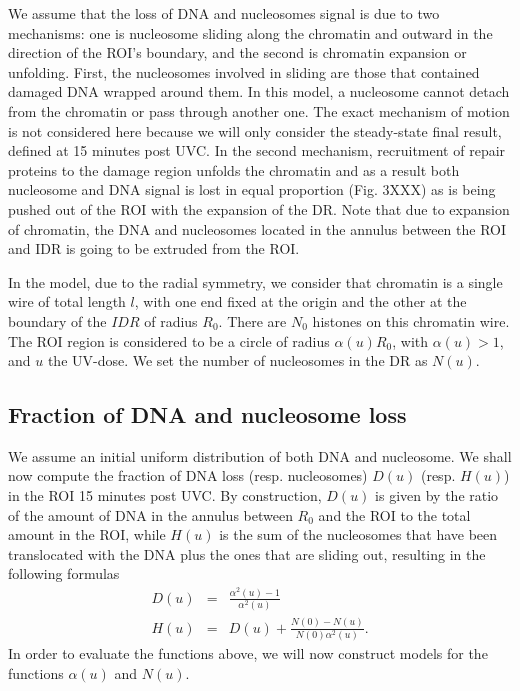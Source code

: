 \documentclass[12pt]{article}
\begin{document}
We assume that the loss of DNA and nucleosomes signal is due to two mechanisms: one is nucleosome sliding along the chromatin and outward in the direction of the ROI's boundary, and the second is chromatin expansion or unfolding. First, the nucleosomes involved in sliding are those that contained damaged DNA wrapped around them. In this model, a nucleosome cannot detach from the chromatin or pass through another one. The exact mechanism of motion is not considered here because we will only consider the steady-state final result, defined at 15 minutes post UVC. In the second mechanism, recruitment of repair proteins to the damage region unfolds the chromatin and as a result  both nucleosome and DNA signal is lost in equal proportion (Fig. 3XXX) as is being pushed out of the ROI with the expansion of the DR. Note that due to expansion of chromatin, the DNA and nucleosomes located in the annulus between the ROI and IDR is going to be extruded from the ROI.

In the model, due to the radial symmetry, we consider that chromatin is a single wire of total length $l$, with one end fixed at the origin and the other at the boundary of the $IDR$ of radius $R_0$. There are $N_0$ histones on this chromatin wire.  The ROI region is considered to be a circle of radius $\alpha(u) R_0$, with  $\alpha(u)> 1$, and $u$ the UV-dose. We set the number of nucleosomes in the DR as $N(u)$.

\subsection{Fraction of DNA and nucleosome loss }\label{subsection:fractionOfDNAandNucleosomeLoss}
We assume an initial uniform distribution of both DNA and nucleosome. 
We shall now compute the fraction of DNA loss (resp. nucleosomes) $D(u)$ (resp. $H(u)$) in the ROI 15 minutes post UVC. By construction, $D(u)$ is given by the ratio of the amount of DNA in the annulus between $R_0$ and the ROI to the total amount in the ROI, while $H(u)$ is the sum of the nucleosomes that have been translocated with the DNA plus the ones that are sliding out, resulting in the following formulas
\begin{eqnarray*}
D(u)&=& \frac{\alpha^2(u) -1}{\alpha^2(u)} \\
H(u)&=&D(u)+\frac{N(0)-N(u)}{N(0) \alpha^2(u)}.
\end{eqnarray*}
In order to evaluate the functions above, we will now construct models for the functions $\alpha(u)$ and $N(u)$.
\end{document}
